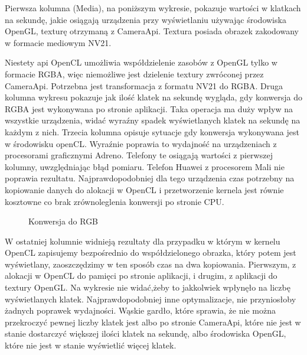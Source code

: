 Pierwsza kolumna (Media), na poniższym wykresie, pokazuje wartości w klatkach na sekundę, jakie osiągają urządzenia przy wyświetlaniu używając środowiska OpenGL, texturę otrzymaną z CameraApi. Textura posiada obrazek zakodowany w formacie mediowym NV21.

Niestety api OpenCL umożliwia współdzielenie zasobów z OpenGL tylko w formacie RGBA, więc niemożliwe jest dzielenie textury zwróconej przez CameraApi. Potrzebna jest transformacja z formatu NV21 do RGBA. Druga kolumna wykresu pokazuje jak ilość klatek na sekundę wygląda, gdy konwersja do RGBA jest wykonywana po stronie aplikacji. Taka operacja ma duży wpływ na wszystkie urządzenia, widać wyraźny spadek wyświetlanych klatek na sekundę na każdym z nich. 
Trzecia kolumna opisuje sytuacje gdy konwersja wykonywana jest w środowisku openCL. Wyraźnie poprawia to wydajność na urządzeniach z procesorami graficznymi Adreno. Telefony te osiągają wartości z pierwszej kolumny, uwzględniając błąd pomiaru. Telefon Huawei z procesorem Mali nie poprawia rezultatu. Najprawdopodobniej dla tego urządzenia czas potrzebny na kopiowanie danych do alokacji w OpenCL i przetworzenie kernela jest równie kosztowne co brak zrównoleglenia konwersji po stronie CPU. 
\begin{figure}[H]
\caption{Konwersja do RGB}
\end{figure}

W ostatniej kolumnie widnieją rezultaty dla przypadku w którym w kernelu OpenCL zapisujemy bezpośrednio do współdzielonego obrazka, który potem jest wyświetlany, zaoszczędzimy w ten sposób czas na dwa kopiowania. Pierwszym, z alokacji w OpenCL do pamięci po stronie aplikacji, i drugim, z aplikacji do textury OpenGL. Na wykresie nie widać,żeby to jakkolwiek wpłynęło na liczbę wyświetlanych klatek. Najprawdopodobniej inne optymalizacje, nie przyniosłoby żadnych poprawek wydajności. Wąskie gardło, które sprawia, że nie można przekroczyć pewnej liczby klatek jest albo po stronie CameraApi, które nie jest w stanie dostarczyć większej ilości klatek na sekundę, albo środowiska OpenGL, które nie jest w stanie wyświetlić więcej klatek.

